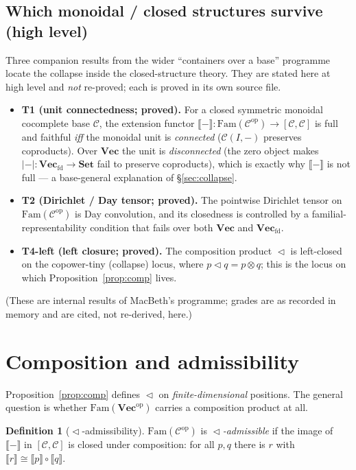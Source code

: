 \documentclass[11pt]{article}
\theoremstyle{plain}
\theoremstyle{definition}
\newtheorem{definition}{Definition}
\theoremstyle{remark}
\newcommand{\C}{\mathcal{C}}
\newcommand{\Set}{\mathbf{Set}}
\newcommand{\Vect}{\mathbf{Vec}}
\newcommand{\Vecfd}{\mathbf{Vec}_{\mathrm{fd}}}
\newcommand{\Fam}{\mathrm{Fam}}
\newcommand{\ext}[1]{\llbracket #1 \rrbracket}
\renewcommand{\lhd}{\vartriangleleft}
\newcommand{\op}{\mathrm{op}}
\begin{document}
\subsection*{Which monoidal / closed structures survive (high level)}

Three companion results from the wider ``containers over a base'' programme locate the collapse
inside the closed-structure theory. They are stated here at high level and \emph{not} re-proved; each
is proved in its own source file.
\begin{itemize}
\item \textbf{T1 (unit connectedness; proved).} For a closed symmetric monoidal cocomplete base
$\C$, the extension functor $\ext{-}\colon\Fam(\C^\op)\to[\C,\C]$ is full and faithful \emph{iff} the
monoidal unit is \emph{connected} ($\C(I,-)$ preserves coproducts). Over $\Vect$ the unit is
\emph{disconnected} (the zero object makes $|{-}|\colon\Vecfd\to\Set$ fail to preserve coproducts),
which is exactly why $\ext{-}$ is not full --- a base-general explanation of \S\ref{sec:collapse}.
\item \textbf{T2 (Dirichlet / Day tensor; proved).} The pointwise Dirichlet tensor on
$\Fam(\C^\op)$ is Day convolution, and its closedness is controlled by a familial-representability
condition that fails over both $\Vect$ and $\Vecfd$.
\item \textbf{T4-left (left closure; proved).} The composition product $\lhd$ is left-closed on the
copower-tiny (collapse) locus, where $p\lhd q=p\otimes q$; this is the locus on which
Proposition~\ref{prop:comp} lives.
\end{itemize}
(These are internal results of MacBeth's programme; grades are as recorded in memory and are cited,
not re-derived, here.)

\section{Composition and admissibility}
\label{sec:admiss}

Proposition~\ref{prop:comp} defines $\lhd$ on \emph{finite-dimensional} positions. The general
question is whether $\Fam(\Vect^\op)$ carries a composition product at all.

\begin{definition}[$\lhd$-admissibility]
$\Fam(\C^\op)$ is \emph{$\lhd$-admissible} if the image of $\ext{-}$ in $[\C,\C]$ is closed under
composition: for all $p,q$ there is $r$ with $\ext{r}\cong\ext{p}\circ\ext{q}$.
\end{definition}
\end{document}
